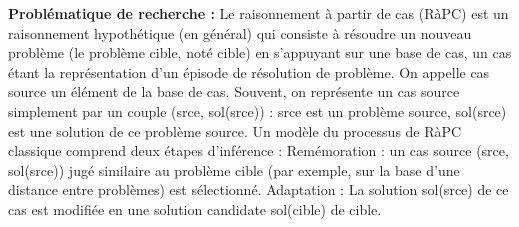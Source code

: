 \documentclass{article}
\begin{document}
{\bfseries Probl\'ematique de recherche : }
\newline
Le raisonnement \`{a} partir de cas (R\`{a}PC) est un raisonnement hypoth\'etique (en g\'en\'eral) qui consiste \`{a} r\'esoudre un nouveau probl\`{e}me (le probl\`{e}me cible, not\'e cible) en s'appuyant sur une base de cas, un cas \'etant la repr\'esentation d'un \'episode de r\'esolution de probl\`{e}me. On appelle cas source un \'el\'ement de la base de cas. Souvent, on repr\'esente un cas source simplement par un couple (srce, sol(srce)) : srce est un probl\`{e}me source, sol(srce) est une solution de ce probl\`{e}me source. Un mod\`{e}le du processus de R\`{a}PC classique comprend deux \'etapes d'inf\'erence : 
Rem\'emoration : un cas source (srce, sol(srce)) jug\'e similaire au probl\`{e}me cible (par exemple, sur la base d'une distance entre probl\`{e}mes) est s\'electionn\'e. 
Adaptation : La solution sol(srce) de ce cas est modifi\'ee en une solution candidate sol(cible) de cible. 
\end{document}

